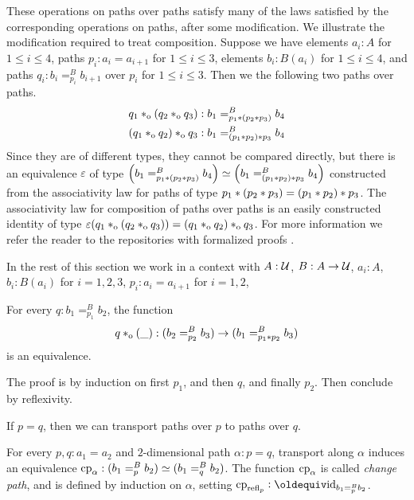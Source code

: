 \documentclass[a4paper,12pt]{amsart}
\begin{document}
These operations on paths over paths satisfy many of the laws satisfied by the corresponding operations on paths, after some modification.  We
illustrate the modification required to treat composition.  Suppose we have elements $a_i : A$ for $1 \le i \le 4$, paths $p_i : a_i = a_{i+1}$
for $1 \le i \le 3$, elements $b_i:B(a_i)$ for $1 \le i \le 4$, and paths $q_i : b_i =^B_{p_i} b_{i+1}$ over $p_i$ for $1 \le i \le 3$.
Then we the following two paths over paths.
\begin{align*}
   q_1 *_{\mathrm{o}} (q_2 *_{\mathrm{o}} q_3) & : b_1 =^B_{p_1* (p_2* p_3)} b_4 \\
  (q_1 *_{\mathrm{o}} q_2) *_{\mathrm{o}} q_3  & : b_1 =^B_{(p_1* p_2) * p_3} b_4
\end{align*}
Since they are of different types, they cannot be compared directly, but there is an
equivalence $\varepsilon$ of type $\left( b_1 =^B_{p_1* (p_2* p_3)} b_4 \right) \simeq \left( b_1 =^B_{(p_1* p_2) * p_3} b_4 \right)$
constructed from the associativity law for paths of type $p_1*(p_2* p_3) = (p_1* p_2)* p_3$.
The associativity law for composition of paths over paths is an easily constructed identity of type $\varepsilon(q_1 *_{\mathrm{o}} (q_2 *_{\mathrm{o}} q_3)) = (q_1 *_{\mathrm{o}} q_2)*_{\mathrm{o}} q_3$.
For more information we refer the reader to the repositories with formalized proofs \cite{circleind-Dan}.

In the rest of this section we work in a context with
$A : \mathcal{U}$, $B : A \to \mathcal{U}$, $a_i:A$, $b_i:B(a_i)$ for $i=1,2,3$,
$p_i : a_i = a_{i+1}$ for $i=1,2$,

\begin{lemma}\label{lem:compo-over}
  For every $q : b_1 =^B_{p_1} b_2$, the
  function
  \[
    q *_{\mathrm{o}} ({\_}) : (b_2 =^B_{p_2} b_3) \to (b_1 =^B_{p_1* p_2} b_3)
  \]
  is an equivalence.
\end{lemma}
The proof is by induction on first $p_1$, and then $q$, and finally $p_2$.
Then conclude by reflexivity.

If $p=q$, then we can transport paths over $p$ to paths over $q$.

\begin{definition}\label{def:pathover-change-path}
  For every $p,q:a_1=a_2$ and $2$-dimensional path $\alpha : p = q$,
  transport along $\alpha$
  induces an equivalence $\mathrm{cp}_{\alpha}: (b_1 =^B_p b_2) \simeq (b_1 =^B_q b_2)$.
  The function $\mathrm{cp}_{\alpha}$ is called \emph{change path}, and is defined
  by induction on $\alpha$, setting $\cp{\refl{p}}\defeq \id_{b_1 =^B_p b_2}$.
\end{definition}
\end{document}
